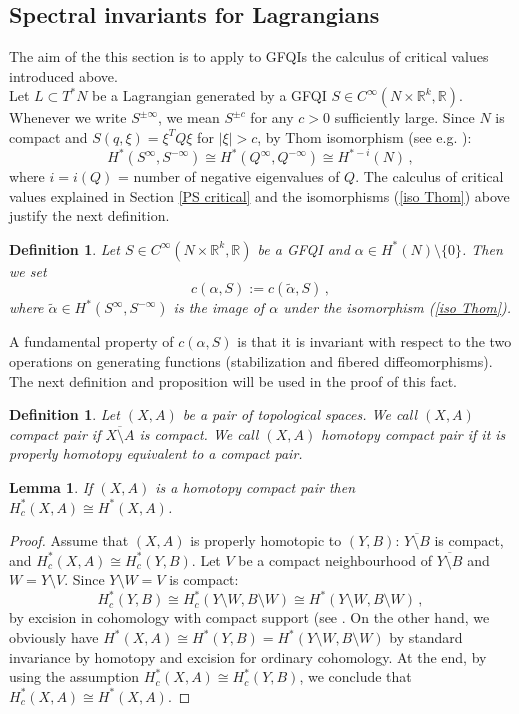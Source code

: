 \documentclass{article}
\newcommand{\1}{\mathbbm{1}}
\newtheorem{lem}[thm]{Lemma}
\newtheorem{defn}[thm]{Definition}
\theoremstyle{remark}
\begin{document}
{{ \subsection{Spectral invariants for Lagrangians}
The aim of the this section is to apply to GFQIs the calculus of critical values introduced above. \\
\indent Let $L \subset T^*N$ be a Lagrangian generated by a GFQI $S \in C^{\infty}(N \times \mathbb{R}^k,\mathbb{R})$. Whenever we write $S^{\pm\infty}$, we mean $S^{\pm c}$ for any $c > 0$ sufficiently large. Since $N$ is compact and $S(q,\xi) = \xi^T Q \xi$ for $\vert\xi\vert > c$, by Thom isomorphism (see e.g. \cite[Theorem 6.17]{Bott-Tu}):
\begin{equation} \label{iso Thom}
H^*(S^\infty, S^{-\infty})\cong H^*(Q^\infty, Q^{-\infty})\cong H^{*-i}(N)\, ,   
\end{equation}
where $i = i(Q)$ = number of negative eigenvalues of $Q$. The calculus of critical values explained in Section \ref{PS critical} and the isomorphisms (\ref{iso Thom}) above justify the next definition. 
\begin{defn}
Let $S \in C^{\infty}(N \times \mathbb{R}^k, \mathbb{R})$ be a GFQI and $\alpha\in H^*(N) \setminus \{0\}$. Then we set
\begin{equation}
c(\alpha, S):=c(\tilde{\alpha}, S)\, ,
\end{equation}
where $\tilde{\alpha} \in H^*(S^\infty, S^{-\infty})$ is the image of $\alpha$ under the isomorphism (\ref{iso Thom}).
\end{defn}

\noindent A fundamental property of $c(\alpha, S)$ is that it is invariant with respect to the two operations on generating functions (stabilization and fibered diffeomorphisms). The next definition and proposition will be used in the proof of this fact. 
\begin{defn}
Let $(X,A)$ be a pair of topological spaces. We call $(X,A)$ compact pair if $\overline{X \setminus A}$ is compact. We call $(X,A)$ homotopy compact pair if it is properly homotopy equivalent to a compact pair.
\end{defn}

\begin{lem}
\label{aiuto Claude}
If $(X,A)$ is a homotopy compact pair then $H^*_c(X,A) \cong H^*(X,A)$. 
\end{lem} 
\begin{proof}
Assume that $(X,A)$ is properly homotopic to $(Y,B)$: $\overline{Y\setminus B}$ is compact, and $H^*_c(X,A) \cong H_c^*(Y,B)$. Let $V$ be a compact neighbourhood of $\overline{Y\setminus B}$ and $W=Y\setminus V$. Since $Y\setminus W = V$ is compact: $$H_c^*(Y,B) \cong H_c^*(Y\setminus W, B\setminus W) \cong H^*(Y\setminus W, B\setminus W)\, ,$$
by excision in cohomology with compact support (see \cite[Lemma 9, p. 320]{Spanier}. On the other hand, we obviously have $H^*(X,A) \cong H^*(Y,B)=H^*(Y\setminus W, B\setminus W)$ by standard invariance by homotopy and excision for ordinary cohomology. At the end, by using the assumption $H^*_c(X,A) \cong H_c^*(Y,B)$, we conclude that $H^*_c(X,A) \cong H^*(X,A)$.
\end{proof}

}}
\end{document}
